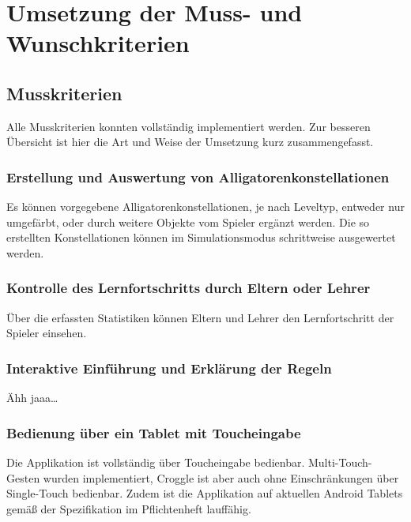 \chapter{Umsetzung der Muss- und Wunschkriterien}


\section{Musskriterien}

Alle Musskriterien konnten vollständig implementiert werden. Zur besseren Übersicht ist hier die Art und Weise der Umsetzung kurz zusammengefasst.

\subsection{Erstellung und Auswertung von Alligatorenkonstellationen}

Es können vorgegebene Alligatorenkonstellationen, je nach Leveltyp, entweder nur umgefärbt, oder durch weitere Objekte vom Spieler ergänzt werden.
Die so erstellten Konstellationen können im Simulationsmodus schrittweise ausgewertet werden.

\subsection{Kontrolle des Lernfortschritts durch Eltern oder Lehrer}

Über die erfassten Statistiken können Eltern und Lehrer den Lernfortschritt der Spieler einsehen.

\subsection{Interaktive Einführung und Erklärung der Regeln}

Ähh jaaa\dots

\subsection{Bedienung über ein Tablet mit Toucheingabe}

Die Applikation ist vollständig über Toucheingabe bedienbar. Multi-Touch-Gesten wurden implementiert, Croggle ist aber auch ohne Einschränkungen über Single-Touch bedienbar.
Zudem ist die Applikation auf aktuellen Android Tablets gemäß der Spezifikation im Pflichtenheft lauffähig.

